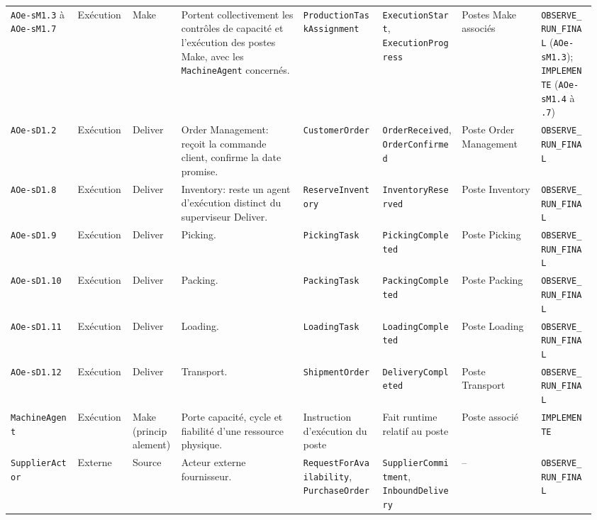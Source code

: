 \begin{landscape}
{\begin{longtable}{L{0.11\linewidth} L{0.09\linewidth} L{0.08\linewidth} L{0.20\linewidth} L{0.13\linewidth} L{0.13\linewidth} L{0.13\linewidth} L{0.09\linewidth}}
\texttt{AOe-s\allowbreak M1.3} à \texttt{AOe-s\allowbreak M1.7} & Exécution & Make & Portent collectivement les contrôles de capacité et l'exécution des postes Make, avec les \texttt{Machine\allowbreak Agent} concernés. & \texttt{Production\allowbreak Task\allowbreak Assignment} & \texttt{Execution\allowbreak Start}, \texttt{Execution\allowbreak Progress} & Postes Make associés & \texttt{OBSERVE\_\allowbreak RUN\_\allowbreak FINAL} (\texttt{AOe-s\allowbreak M1.3}); \texttt{IMPLEMENTE} (\texttt{AOe-s\allowbreak M1.4} à \texttt{.7}) \\
\texttt{AOe-s\allowbreak D1.2} & Exécution & Deliver & Order Management: reçoit la commande client, confirme la date promise. & \texttt{Customer\allowbreak Order} & \texttt{Order\allowbreak Received}, \texttt{Order\allowbreak Confirmed} & Poste Order Management & \texttt{OBSERVE\_\allowbreak RUN\_\allowbreak FINAL} \\
\texttt{AOe-s\allowbreak D1.8} & Exécution & Deliver & Inventory: reste un agent d'exécution distinct du superviseur Deliver. & \texttt{Reserve\allowbreak Inventory} & \texttt{Inventory\allowbreak Reserved} & Poste Inventory & \texttt{OBSERVE\_\allowbreak RUN\_\allowbreak FINAL} \\
\texttt{AOe-s\allowbreak D1.9} & Exécution & Deliver & Picking. & \texttt{Picking\allowbreak Task} & \texttt{Picking\allowbreak Completed} & Poste Picking & \texttt{OBSERVE\_\allowbreak RUN\_\allowbreak FINAL} \\
\texttt{AOe-s\allowbreak D1.10} & Exécution & Deliver & Packing. & \texttt{Packing\allowbreak Task} & \texttt{Packing\allowbreak Completed} & Poste Packing & \texttt{OBSERVE\_\allowbreak RUN\_\allowbreak FINAL} \\
\texttt{AOe-s\allowbreak D1.11} & Exécution & Deliver & Loading. & \texttt{Loading\allowbreak Task} & \texttt{Loading\allowbreak Completed} & Poste Loading & \texttt{OBSERVE\_\allowbreak RUN\_\allowbreak FINAL} \\
\texttt{AOe-s\allowbreak D1.12} & Exécution & Deliver & Transport. & \texttt{Shipment\allowbreak Order} & \texttt{Delivery\allowbreak Completed} & Poste Transport & \texttt{OBSERVE\_\allowbreak RUN\_\allowbreak FINAL} \\
\texttt{Machine\allowbreak Agent} & Exécution & Make (principalement) & Porte capacité, cycle et fiabilité d'une ressource physique. & Instruction d'exécution du poste & Fait runtime relatif au poste & Poste associé & \texttt{IMPLEMENTE} \\
\texttt{Supplier\allowbreak Actor} & Externe & Source & Acteur externe fournisseur. & \texttt{Request\allowbreak For\allowbreak Availability}, \texttt{Purchase\allowbreak Order} & \texttt{Supplier\allowbreak Commitment}, \texttt{Inbound\allowbreak Delivery} & -- & \texttt{OBSERVE\_\allowbreak RUN\_\allowbreak FINAL} \\

\end{longtable}}
\end{landscape}
